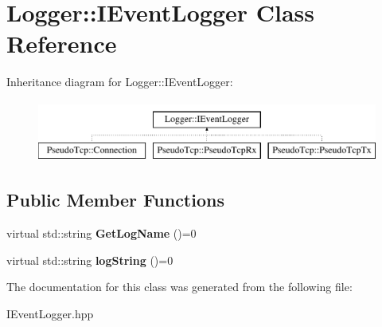 \hypertarget{classLogger_1_1IEventLogger}{
\section{Logger::IEventLogger Class Reference}
\label{classLogger_1_1IEventLogger}
}
Inheritance diagram for Logger::IEventLogger:\begin{figure}[H]
\begin{center}
\leavevmode
\includegraphics[height=2cm]{classLogger_1_1IEventLogger}
\end{center}
\end{figure}
\subsection*{Public Member Functions}
\begin{DoxyCompactItemize}
\item 
\hypertarget{classLogger_1_1IEventLogger_abc4749625087fc9ebcfa992cc1ee078a}{
virtual std::string {\bfseries GetLogName} ()=0}
\label{classLogger_1_1IEventLogger_abc4749625087fc9ebcfa992cc1ee078a}

\item 
\hypertarget{classLogger_1_1IEventLogger_a4ea2d0512baf7042a98bbe76a7836bd6}{
virtual std::string {\bfseries logString} ()=0}
\label{classLogger_1_1IEventLogger_a4ea2d0512baf7042a98bbe76a7836bd6}

\end{DoxyCompactItemize}


The documentation for this class was generated from the following file:\begin{DoxyCompactItemize}
\item 
IEventLogger.hpp\end{DoxyCompactItemize}
